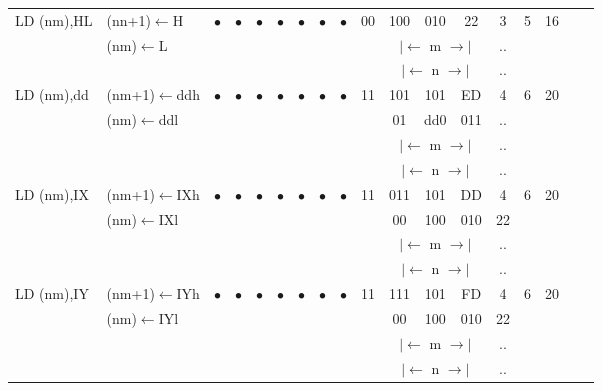 \documentclass[oneside,a4paper]{book}
\begin{document}
{\begin{tabular}{llcccccccccccccccl}
		LD (nm),HL\instrt &
			(nn+1)$\leftarrow$H &
			$\bullet$ & 
				$\bullet$ & 
				$\bullet$ & 
				$\bullet$ & 
				$\bullet$ & 
				$\bullet$ & 
				$\bullet$ & 
			00 & 100 & 010 & 
			22 & 3 & 
			5 & 16 & \\ 
		& (nm)$\leftarrow$L & \multicolumn{8}{c}{} & \multicolumn{3}{c}{$|\longleftarrow$ m $\longrightarrow|$} & .. & & & \\
		\multicolumn{10}{c}{} & \multicolumn{3}{c}{$|\longleftarrow$ n $\longrightarrow|$} & .. & & & \instrb \\

		LD (nm),dd\instrt & 
			(nm+1)$\leftarrow$ddh &
			$\bullet$ & 
				$\bullet$ & 
				$\bullet$ & 
				$\bullet$ & 
				$\bullet$ & 
				$\bullet$ & 
				$\bullet$ & 
			11 & 101 & 101 & 
			ED & 4 & 
			6 & 20 & \\ 
		& (nm)$\leftarrow$ddl & \multicolumn{8}{c}{} & 01 & dd0 & 011 & .. & & & \\
		\multicolumn{10}{c}{} & \multicolumn{3}{c}{$|\longleftarrow$ m $\longrightarrow|$} & .. & & & \\
		\multicolumn{10}{c}{} & \multicolumn{3}{c}{$|\longleftarrow$ n $\longrightarrow|$} & .. & & & \instrb \\

		LD (nm),IX\instrt & 
			(nm+1)$\leftarrow$IXh &
			$\bullet$ & 
				$\bullet$ & 
				$\bullet$ & 
				$\bullet$ & 
				$\bullet$ & 
				$\bullet$ & 
				$\bullet$ & 
			11 & 011 & 101 & 
			DD & 4 & 
			6 & 20 & \\ 
		& (nm)$\leftarrow$IXl & \multicolumn{8}{c}{} & 00 & 100 & 010 & 22 & & & \\
		\multicolumn{10}{c}{} & \multicolumn{3}{c}{$|\longleftarrow$ m $\longrightarrow|$} & .. & & & \\
		\multicolumn{10}{c}{} & \multicolumn{3}{c}{$|\longleftarrow$ n $\longrightarrow|$} & .. & & & \instrb \\

		LD (nm),IY\instrt & 
			(nm+1)$\leftarrow$IYh &
			$\bullet$ & 
				$\bullet$ & 
				$\bullet$ & 
				$\bullet$ & 
				$\bullet$ & 
				$\bullet$ & 
				$\bullet$ & 
			11 & 111 & 101 & 
			FD & 4 & 
			6 & 20 & \\ 
		& (nm)$\leftarrow$IYl & \multicolumn{8}{c}{} & 00 & 100 & 010 & 22 & & & \\
		\multicolumn{10}{c}{} & \multicolumn{3}{c}{$|\longleftarrow$ m $\longrightarrow|$} & .. & & & \\
		\multicolumn{10}{c}{} & \multicolumn{3}{c}{$|\longleftarrow$ n $\longrightarrow|$} & .. & & & \instrb \\


\end{tabular}}
\end{document}
